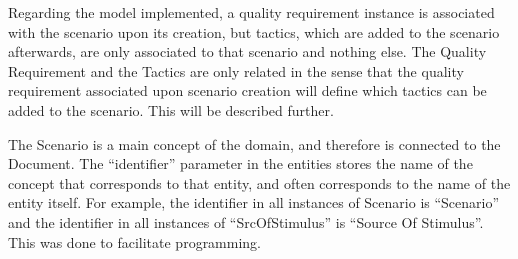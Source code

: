 Regarding the model implemented, a quality requirement instance is associated with the scenario upon its creation, but tactics, which are added to the scenario afterwards, are only associated to that scenario and nothing else. The Quality Requirement and the Tactics are only related in the sense that the quality requirement associated upon scenario creation will define which tactics can be added to the scenario. This will be described further.

The Scenario is a main concept of the domain, and therefore is connected to the Document. The ``identifier'' parameter in the entities stores the name of the concept that corresponds to that entity, and often corresponds to the name of the entity itself. For example, the identifier in all instances of Scenario is ``Scenario'' and the identifier in all instances of ``SrcOfStimulus'' is ``Source Of Stimulus''. This was done to facilitate programming. 

